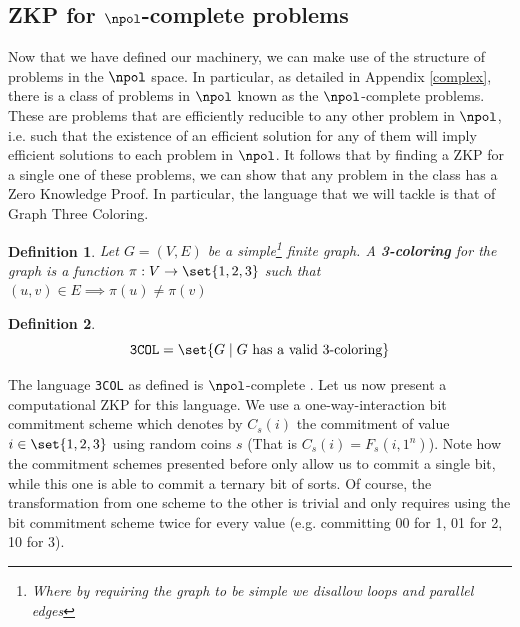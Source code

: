 \documentclass{article}
\newtheorem{definition}{Definition}
\begin{document}
\subsection{ZKP for \texorpdfstring{$\npol$}{NP}-complete problems}
\label{np}
Now that we have defined our machinery, we can make use of the structure of problems in the $\npol$ space.
In particular, as detailed in Appendix \ref{complex}, there is a class of problems in $\npol$ known as the $\npol$-complete problems.
These are problems that are efficiently reducible to any other problem in $\npol$, i.e. such that the existence of an efficient solution for any of them will imply efficient solutions to each problem in $\npol$.
It follows that by finding a ZKP for a single one of these problems, we can show that any problem in the class has a Zero Knowledge Proof.
In particular, the language that we will tackle is that of Graph Three Coloring.
\begin{definition}
    Let $G = (V, E)$ be a simple\footnote{Where by requiring the graph to be simple we disallow loops and parallel edges} finite graph. A \textbf{3-coloring} for the graph is a function $\pi: V \to \set{1, 2, 3}$
    such that $(u, v) \in E \implies \pi(u) \neq \pi(v)$
\end{definition}
\begin{definition}
    \[ \texttt{3COL} = \set{ G \; | \; G \text{ has a valid 3-coloring} } \]
\end{definition}
The language \texttt{3COL} as defined is $\npol$-complete \cite{karpReducibilityCombinatorialProblems1972}.
Let us now present a computational ZKP \cite{goldreichProofsThatYield1991} \cite{goldreichMethodologyCryptographicProtocol} for this language. We use a one-way-interaction bit commitment scheme which denotes by
$C_s(i)$ the commitment of value $i \in \set{1, 2, 3}$ using random coins $s$ (That is $C_s(i) = F_s(i, 1^n)$). Note how the commitment schemes
presented before only allow us to commit a single bit, while this one is able to commit a ternary bit of sorts. Of course, the transformation
from one scheme to the other is trivial and only requires using the bit commitment scheme twice for every value (e.g. committing 00 for 1, 01 for 2, 10 for 3).
\end{document}
